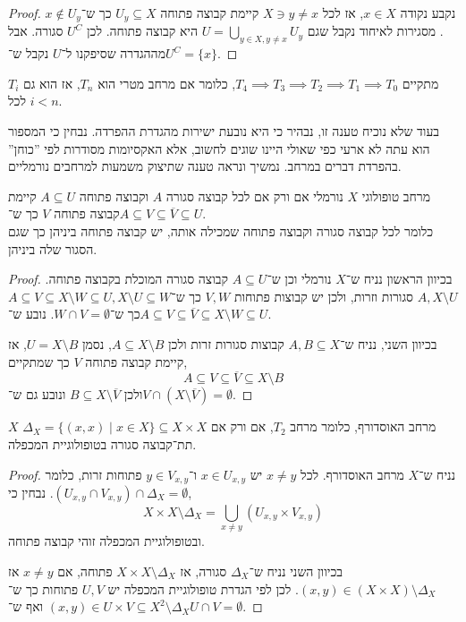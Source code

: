 \begin{proof}
	נקבע נקודה $x \in X$, אז לכל $X \ni y \ne x$ קיימת קבוצה פתוחה $U_y \subseteq X$ כך ש־$x \notin U_y$.
	מסגירות לאיחוד נקבל שגם $U = \bigcup_{y \in X, y \ne x} U_y$ היא קבוצה פתוחה.
	לכן $U^C$ סגורה.
	אבל מההגדרה שסיפקנו ל־$U$ נקבל ש־$U^C = \{ x \}$.
\end{proof}
\begin{proposition}
	מתקיים $T_4 \implies T_3 \implies T_2 \implies T_1 \implies T_0$,
	כלומר אם מרחב מטרי הוא $T_n$, אז הוא גם $T_i$ לכל $i < n$.
\end{proposition}
בעוד שלא נוכיח טענה זו, נבהיר כי היא נובעת ישירות מהגדרת ההפרדה.
נבחין כי המספור הוא עתה לא ארעי כפי שאולי היינו שוגים לחשוב, אלא האקסיומות מסודרות לפי ''כוחן'' בהפרדת דברים במרחב.
נמשיך ונראה טענה שתיצוק משמעות למרחבים נורמליים.
\begin{proposition}
	מרחב טופולוגי $X$ נורמלי אם ורק אם לכל קבוצה סגורה $A$ וקבוצה פתוחה $A \subseteq U$ קיימת קבוצה פתוחה $V$ כך ש־$A \subseteq V \subseteq \overline{V} \subseteq U$. \\
	כלומר לכל קבוצה סגורה וקבוצה פתוחה שמכילה אותה, יש קבוצה פתוחה ביניהן כך שגם הסגור שלה ביניהן.
\end{proposition}
\begin{proof}
	בכיוון הראשון נניח ש־$X$ נורמלי וכן ש־$A \subseteq U$ קבוצה סגורה המוכלת בקבוצה פתוחה.
	$A, X \setminus U$ סגורות וזרות, ולכן יש קבוצות פתוחות $V, W$ כך ש־$A \subseteq V \subseteq X \setminus W \subseteq U, X \setminus U \subseteq W$ כך ש־$W \cap V = \emptyset$.
	נובע ש־$A \subseteq V \subseteq \overline{V} \subseteq X \setminus W \subseteq U$.

	בכיוון השני, נניח ש־$A, B \subseteq X$ קבוצות סגורות זרות ולכן $A \subseteq X \setminus B$, נסמן $U = X \setminus B$, אז קיימת קבוצה פתוחה $V$ כך שמתקיים,
	\[
		A \subseteq V \subseteq \overline{V} \subseteq X \setminus B
	\]
	ולכן $B \subseteq X \setminus \overline{V}$ ונובע גם ש־$V \cap (X \setminus \overline{V}) = \emptyset$.
\end{proof}
\begin{proposition}
	$X$ מרחב האוסדורף, כלומר מרחב $T_2$,
	אם ורק אם $\Delta_X = \{ (x, x) \mid x \in X \} \subseteq X \times X$ תת־קבוצה סגורה בטופולוגיית המכפלה.
\end{proposition}
\begin{proof}
	נניח ש־$X$ מרחב האוסדורף.
	לכל $x \ne y$ יש $x \in U_{x, y}$ ו־$y \in V_{x, y}$ פתוחות זרות, כלומר $(U_{x, y} \cap V_{x, y}) \cap \Delta_X = \emptyset$.
	נבחין כי,
	\[
		X \times X \setminus \Delta_X = \bigcup_{x \ne y} (U_{x, y} \times V_{x, y})
	\]
	ובטופולוגיית המכפלה זוהי קבוצה פתוחה.

	בכיוון השני נניח ש־$\Delta_X$ סגורה, אז $X \times X \setminus \Delta_X$ פתוחה, אם $x \ne y$ אז $(x, y) \in (X \times X) \setminus \Delta_X$.
	לכן לפי הגדרת טופולוגיית המכפלה יש $U, V$ פתוחות כך ש־$(x, y) \in U \times V \subseteq X^2 \setminus \Delta_X$ ואף ש־$U \cap V = \emptyset$.
\end{proof}
